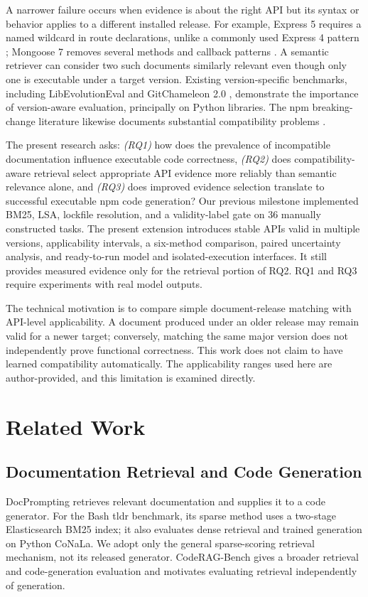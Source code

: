 \documentclass[conference]{IEEEtran}
\begin{document}
A narrower failure occurs when evidence is about the right API but its syntax or behavior applies to a different installed release. For example, Express 5 requires a named wildcard in route declarations, unlike a commonly used Express 4 pattern \cite{express}; Mongoose 7 removes several methods and callback patterns \cite{mongoose}. A semantic retriever can consider two such documents similarly relevant even though only one is executable under a target version. Existing version-specific benchmarks, including LibEvolutionEval and GitChameleon 2.0 \cite{libevolution,gitchameleon}, demonstrate the importance of version-aware evaluation, principally on Python libraries. The npm breaking-change literature likewise documents substantial compatibility problems \cite{npmchanges}.

The present research asks: \emph{(RQ1)} how does the prevalence of incompatible documentation influence executable code correctness, \emph{(RQ2)} does compatibility-aware retrieval select appropriate API evidence more reliably than semantic relevance alone, and \emph{(RQ3)} does improved evidence selection translate to successful executable npm code generation? Our previous milestone implemented BM25, LSA, lockfile resolution, and a validity-label gate on 36 manually constructed tasks. The present extension introduces stable APIs valid in multiple versions, applicability intervals, a six-method comparison, paired uncertainty analysis, and ready-to-run model and isolated-execution interfaces. It still provides measured evidence only for the retrieval portion of RQ2. RQ1 and RQ3 require experiments with real model outputs.

The technical motivation is to compare simple document-release matching with API-level applicability. A document produced under an older release may remain valid for a newer target; conversely, matching the same major version does not independently prove functional correctness. This work does not claim to have learned compatibility automatically. The applicability ranges used here are author-provided, and this limitation is examined directly.

\section{Related Work}
\subsection{Documentation Retrieval and Code Generation}
DocPrompting \cite{docprompting} retrieves relevant documentation and supplies it to a code generator. For the Bash tldr benchmark, its sparse method uses a two-stage Elasticsearch BM25 index; it also evaluates dense retrieval and trained generation on Python CoNaLa. We adopt only the general sparse-scoring retrieval mechanism, not its released generator. CodeRAG-Bench \cite{coderag} gives a broader retrieval and code-generation evaluation and motivates evaluating retrieval independently of generation.
\end{document}
